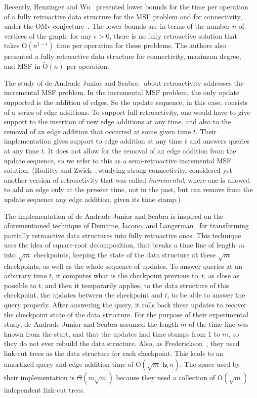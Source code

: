 \documentclass[3p,times,procedia]{elsarticle}
\newcommand{\eps}{\epsilon}
\newcommand{\Oh}{\mathrm{O}}
\begin{document}
Recently, Henzinger and Wu~\cite{HenzingerW2021} presented lower bounds for the 
time per operation of a fully retroactive data structure for the MSF problem and 
for connectivity, under the OMv conjecture~\cite{HenzingerKNS2015}.  The lower 
bounds are in terms of the number $n$ of vertices of the graph: for any $\eps>0$,
there is no fully retroactive solution that takes $\Oh(n^{1-\eps})$ time per 
operation for these problems.  The authors also presented a fully retroactive
data structure for connectivity, maximum degree, and MSF in $\tilde{\Oh}(n)$ 
per operation.  

The study of de Andrade Junior and Seabra~\cite{deAndradeJrS2022} about retroactivity 
addresses the incremental MSF problem.  In the incremental MSF problem, the only update
supported is the addition of edges.  So the update sequence, in this case, consists 
of a series of edge additions.  To support full retroactivity, one would have to give 
support to the insertion of new edge additions at any time, and also to the removal 
of an edge addition that occurred at some given time $t$.  Their implementation 
gives support to edge addition at any time $t$ and answers queries at any time $t$.  
It does not allow for the removal of an edge addition from the update sequence, 
so we refer to this as a semi-retroactive incremental MSF solution.
(Roditty and Zwick~\cite{RodittyZ2016}, studying strong connectivity, considered
yet another version of retroactivity that was called \emph{incremental}, 
where one is allowed to add an edge only at the present time, not in the past, 
but can remove from the update sequence any edge addition, given its time stamp.) 

The implementation of de Andrade Junior and Seabra is inspired on the
aforementioned technique of Demaine, Iacono, and Langerman~\cite[Theorem~5]{DemaineIL2007}
for transforming partially retroactive data structures into fully retroactive ones.
This technique uses the idea of square-root decomposition,
that breaks a time line of length~$m$ into $\sqrt{m}$ checkpoints, 
keeping the state of the data structure at these $\sqrt{m}$ checkpoints, 
as well as the whole sequence of updates.  
To answer queries at an arbitrary time $t$, 
it computes what is the checkpoint previous to~$t$, as close as possible to $t$, 
and then it temporarily applies, to the data structure of this checkpoint, 
the updates between the checkpoint and $t$, to be able to answer the query properly.  
After answering the query, 
it rolls back these updates to recover the checkpoint state of the data structure.  
For the purpose of their experimental study, de Andrade Junior and Seabra assumed
the length $m$ of the time line was known from the start, and that the updates
had time stamps from 1 to $m$, so they do not ever rebuild the data structure.
Also, as Frederickson~\cite{Frederickson1983}, 
they used link-cut trees as the data structure for each checkpoint.  
This leads to an amortized query and edge addition time of $\Oh(\sqrt{m}\lg n)$.  
The space used by their implementation is $\Theta(m\sqrt{m})$ 
because they used a collection of $\Oh(\sqrt{m})$ independent link-cut trees. 
\end{document}
